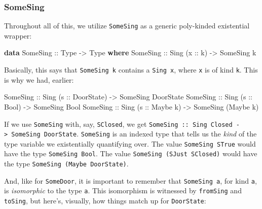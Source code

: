 \documentclass[]{article}
\newenvironment{Shaded}{}{}
\newcommand{\DataTypeTok}[1]{\textcolor[rgb]{0.56,0.13,0.00}{#1}}
\newcommand{\KeywordTok}[1]{\textcolor[rgb]{0.00,0.44,0.13}{\textbf{#1}}}
\newcommand{\NormalTok}[1]{#1}
\newcommand{\OtherTok}[1]{\textcolor[rgb]{0.00,0.44,0.13}{#1}}
\begin{document}
\hypertarget{somesing}{%
\subsubsection{SomeSing}\label{somesing}}

Throughout all of this, we utilize \texttt{SomeSing} as a generic poly-kinded
existential wrapper:

\begin{Shaded}
\begin{Highlighting}[]
\KeywordTok{data} \DataTypeTok{SomeSing}\OtherTok{ ::} \DataTypeTok{Type} \OtherTok{->} \DataTypeTok{Type} \KeywordTok{where}
    \DataTypeTok{SomeSing}\OtherTok{ ::} \DataTypeTok{Sing}\NormalTok{ (}\OtherTok{x ::}\NormalTok{ k) }\OtherTok{->} \DataTypeTok{SomeSing}\NormalTok{ k}
\end{Highlighting}
\end{Shaded}

Basically, this says that \texttt{SomeSing\ k} contains a \texttt{Sing\ x},
where \texttt{x} is of kind \texttt{k}. This is why we had, earlier:

\begin{Shaded}
\begin{Highlighting}[]
\DataTypeTok{SomeSing}\OtherTok{ ::} \DataTypeTok{Sing}\NormalTok{ (}\OtherTok{s ::} \DataTypeTok{DoorState}\NormalTok{) }\OtherTok{->} \DataTypeTok{SomeSing} \DataTypeTok{DoorState}
\DataTypeTok{SomeSing}\OtherTok{ ::} \DataTypeTok{Sing}\NormalTok{ (}\OtherTok{s ::} \DataTypeTok{Bool}\NormalTok{)      }\OtherTok{->} \DataTypeTok{SomeSing} \DataTypeTok{Bool}
\DataTypeTok{SomeSing}\OtherTok{ ::} \DataTypeTok{Sing}\NormalTok{ (}\OtherTok{s ::} \DataTypeTok{Maybe}\NormalTok{ k)   }\OtherTok{->} \DataTypeTok{SomeSing}\NormalTok{ (}\DataTypeTok{Maybe}\NormalTok{ k)}
\end{Highlighting}
\end{Shaded}

If we use \texttt{SomeSing} with, say, \texttt{SClosed}, we get
\texttt{SomeSing\ ::\ Sing\ \textquotesingle{}Closed\ -\textgreater{}\ SomeSing\ DoorState}.
\texttt{SomeSing} is an indexed type that tells us the \emph{kind} of the type
variable we existentially quantifying over. The value \texttt{SomeSing\ STrue}
would have the type \texttt{SomeSing\ Bool}. The value
\texttt{SomeSing\ (SJust\ SClosed)} would have the type
\texttt{SomeSing\ (Maybe\ DoorState)}.

And, like for \texttt{SomeDoor}, it is important to remember that
\texttt{SomeSing\ a}, for kind \texttt{a}, is \emph{isomorphic} to the type
\texttt{a}. This isomorphism is witnessed by \texttt{fromSing} and
\texttt{toSing}, but here's, visually, how things match up for
\texttt{DoorState}:
\end{document}
